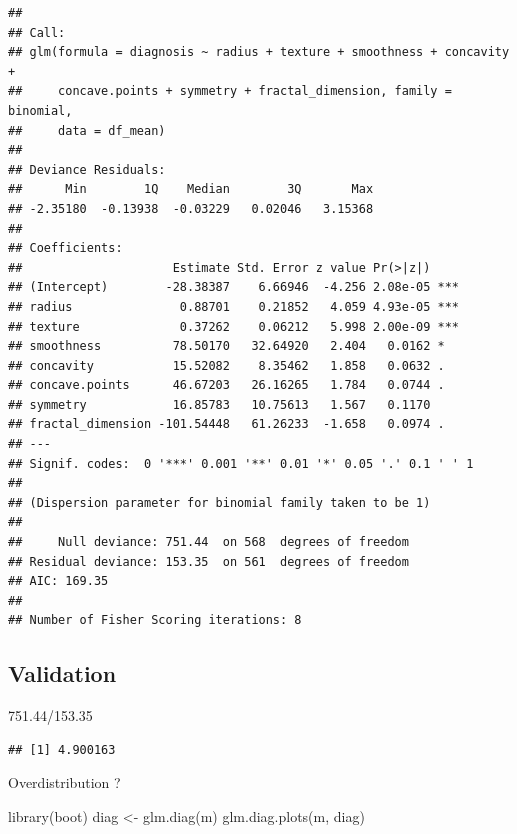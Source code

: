 \documentclass[
  11pt,
]{article}
\newenvironment{Shaded}{\begin{snugshade}}{\end{snugshade}}
\newcommand{\FloatTok}[1]{\textcolor[rgb]{0.00,0.00,0.81}{#1}}
\newcommand{\FunctionTok}[1]{\textcolor[rgb]{0.00,0.00,0.00}{#1}}
\newcommand{\NormalTok}[1]{#1}
\newcommand{\OtherTok}[1]{\textcolor[rgb]{0.56,0.35,0.01}{#1}}
\newcommand{\SpecialCharTok}[1]{\textcolor[rgb]{0.00,0.00,0.00}{#1}}
\begin{document}
\begin{verbatim}
## 
## Call:
## glm(formula = diagnosis ~ radius + texture + smoothness + concavity + 
##     concave.points + symmetry + fractal_dimension, family = binomial, 
##     data = df_mean)
## 
## Deviance Residuals: 
##      Min        1Q    Median        3Q       Max  
## -2.35180  -0.13938  -0.03229   0.02046   3.15368  
## 
## Coefficients:
##                     Estimate Std. Error z value Pr(>|z|)    
## (Intercept)        -28.38387    6.66946  -4.256 2.08e-05 ***
## radius               0.88701    0.21852   4.059 4.93e-05 ***
## texture              0.37262    0.06212   5.998 2.00e-09 ***
## smoothness          78.50170   32.64920   2.404   0.0162 *  
## concavity           15.52082    8.35462   1.858   0.0632 .  
## concave.points      46.67203   26.16265   1.784   0.0744 .  
## symmetry            16.85783   10.75613   1.567   0.1170    
## fractal_dimension -101.54448   61.26233  -1.658   0.0974 .  
## ---
## Signif. codes:  0 '***' 0.001 '**' 0.01 '*' 0.05 '.' 0.1 ' ' 1
## 
## (Dispersion parameter for binomial family taken to be 1)
## 
##     Null deviance: 751.44  on 568  degrees of freedom
## Residual deviance: 153.35  on 561  degrees of freedom
## AIC: 169.35
## 
## Number of Fisher Scoring iterations: 8
\end{verbatim}

\hypertarget{validation}{%
\subsection{Validation}\label{validation}}

\begin{Shaded}
\begin{Highlighting}[]
\FloatTok{751.44}\SpecialCharTok{/}\FloatTok{153.35}
\end{Highlighting}
\end{Shaded}

\begin{verbatim}
## [1] 4.900163
\end{verbatim}

Overdistribution ?

\begin{Shaded}
\begin{Highlighting}[]
  \FunctionTok{library}\NormalTok{(boot)}
\NormalTok{  diag }\OtherTok{\textless{}{-}} \FunctionTok{glm.diag}\NormalTok{(m)}
  \FunctionTok{glm.diag.plots}\NormalTok{(m, diag)}
\end{Highlighting}
\end{Shaded}
\end{document}
